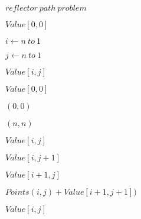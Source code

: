\documentclass[10pt]{book}
\begin{document}
\begin{mdSnippets}
\begin{mdInlineSnippet}[76348a1df06ae146ff7c8bceafc4c4b1]
$reflector~path~problem$\end{mdInlineSnippet}%
\begin{mdInlineSnippet}[8e427a77a8c2a2e3fcf9453d2ee06909]%
$Value[0,0]$\end{mdInlineSnippet}%
\begin{mdInlineSnippet}[d305939a16cc485e72ab0e23f897fdd3]%
$i \leftarrow n~to~1$\end{mdInlineSnippet}%
\begin{mdInlineSnippet}[b4da3ad3bbe9176d09e38273cf0888b0]%
$j \leftarrow n~to~1$\end{mdInlineSnippet}%
\begin{mdInlineSnippet}%
$Value[i, j]$\end{mdInlineSnippet}%
\begin{mdInlineSnippet}[75f6214a18a7cac948862c19332db525]%
$Value[0, 0]$\end{mdInlineSnippet}%
\begin{mdInlineSnippet}[bb9fd77684530503f3765280b54c2413]%
$(0, 0)$\end{mdInlineSnippet}%
\begin{mdInlineSnippet}%
$(n, n)$\end{mdInlineSnippet}%
\begin{mdInlineSnippet}%
$Value[i, j]$\end{mdInlineSnippet}%
\begin{mdInlineSnippet}[91779acbd43e94ed718cd0682cc7ee64]%
$Value[i, j+1]$\end{mdInlineSnippet}%
\begin{mdInlineSnippet}[52cc51eb2ff153ab9aafc0ad0b88300c]%
$Value[i+1, j]$\end{mdInlineSnippet}%
\begin{mdInlineSnippet}%
$Points(i, j) + Value[i+1, j+1])$\end{mdInlineSnippet}%
\begin{mdInlineSnippet}%
$Value[i, j]$\end{mdInlineSnippet}%
\begin{mdInlineSnippet}[50f17e5c11d610b19c0471830dc4dda1]%

\end{mdInlineSnippet}
\end{mdSnippets}
\end{document}
